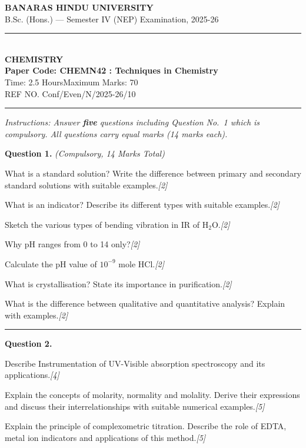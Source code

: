 \documentclass[11pt,a4paper]{article}
\newcommand{\pts}[1]{\hfill   \textit{[#1]}}
\begin{document}
\begin{center}
  {\large\bfseries BANARAS HINDU UNIVERSITY}\\[2pt]
  {\normalsize B.Sc. (Hons.) --- Semester IV (NEP) Examination, 2025-26}\\[6pt]
  \rule{0.8\linewidth}{0.5pt}\\[6pt]
  {\large\bfseries CHEMISTRY}\\[4pt]
  {\large\bfseries Paper Code: CHEMN42 : Techniques in Chemistry}\\[4pt]
  {\normalsize Time: 2.5 Hours\hfill Maximum Marks: 70}\\[2pt]
  {\small REF NO. Conf/Even/N/2025-26/10}
\end{center}

\rule{\linewidth}{0.4pt}

\smallskip



\noindent   \textit{Instructions: Answer   \textbf{five} questions including Question No.~1 which is compulsory. All questions carry equal marks (14 marks each).}

\bigskip




\noindent   \textbf{Question 1.}   \textit{(Compulsory, 14 Marks Total)}

\begin{parts}
  \item What is a standard solution? Write the difference between primary and secondary standard solutions with suitable examples.\pts{2}
  \item What is an indicator? Describe its different types with suitable examples.\pts{2}
  \item Sketch the various types of bending vibration in IR of $ \text{H}_2 \text{O}$.\pts{2}
  \item Why pH ranges from 0 to 14 only?\pts{2}
  \item Calculate the pH value of $10^{-9}$ mole $ \text{HCl}$.\pts{2}
  \item What is crystallisation? State its importance in purification.\pts{2}
  \item What is the difference between qualitative and quantitative analysis? Explain with examples.\pts{2}
\end{parts}

\medskip\rule{\linewidth}{0.2pt}\medskip




\noindent   \textbf{Question 2.}

\begin{parts}
  \item Describe Instrumentation of UV-Visible absorption spectroscopy and its applications.\pts{4}
  \item Explain the concepts of molarity, normality and molality. Derive their expressions and discuss their interrelationships with suitable numerical examples.\pts{5}
  \item Explain the principle of complexometric titration. Describe the role of EDTA, metal ion indicators and applications of this method.\pts{5}
\end{parts}
\end{document}
